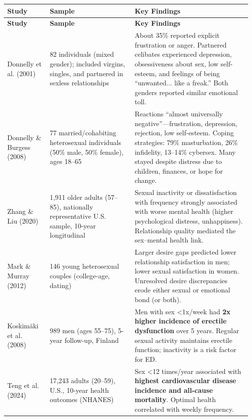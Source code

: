 \documentclass[12pt, letterpaper]{article}
\begin{document}
\begin{longtable}{|p{2.8cm}|p{3.5cm}|p{7.5cm}|}
\hline
\textbf{Study} & \textbf{Sample} & \textbf{Key Findings} \\
\hline
\endfirsthead
\hline
\textbf{Study} & \textbf{Sample} & \textbf{Key Findings} \\
\hline
\endhead
\hline
\endfoot

Donnelly et al. (2001) & 82 individuals (mixed gender); included virgins, singles, and partnered in sexless relationships & About 35\% reported explicit frustration or anger. Partnered celibates experienced depression, obsessiveness about sex, low self-esteem, and feelings of being ``unwanted... like a freak.'' Both genders reported similar emotional toll. \\
\hline

Donnelly \& Burgess (2008) & 77 married/cohabiting heterosexual individuals (50\% male, 50\% female), ages 18--65 & Reactions ``almost universally negative''---frustration, depression, rejection, low self-esteem. Coping strategies: 79\% masturbation, 26\% infidelity, 13--14\% cybersex. Many stayed despite distress due to children, finances, or hope for change. \\
\hline

Zhang \& Liu (2020) & 1,911 older adults (57--85), nationally representative U.S. sample, 10-year longitudinal & Sexual inactivity or dissatisfaction with frequency strongly associated with worse mental health (higher psychological distress, unhappiness). Relationship quality mediated the sex--mental health link. \\
\hline

Mark \& Murray (2012) & 146 young heterosexual couples (college-age, dating) & Larger desire gaps predicted lower relationship satisfaction in men; lower sexual satisfaction in women. Unresolved desire discrepancies erode either sexual or emotional bond (or both). \\
\hline

Koskimäki et al. (2008) & 989 men (ages 55--75), 5-year follow-up, Finland & Men with sex \textless1x/week had \textbf{2x higher incidence of erectile dysfunction} over 5 years. Regular sexual activity maintains erectile function; inactivity is a risk factor for ED. \\
\hline

Teng et al. (2024) & 17,243 adults (20--59), U.S., 10-year health outcomes (NHANES) & Sex \textless12 times/year associated with \textbf{highest cardiovascular disease incidence and all-cause mortality}. Optimal health correlated with weekly frequency. \\
\hline


\end{longtable}
\end{document}
